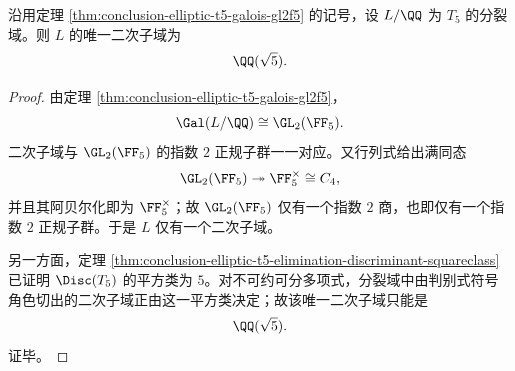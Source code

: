 \begin{theorem}\label{thm:conclusion-elliptic-t5-unique-quadratic-subfield}
沿用定理 \ref{thm:conclusion-elliptic-t5-galois-gl2f5} 的记号，设 \(L/\QQ\) 为 \(T_5\) 的分裂域。则 \(L\) 的唯一二次子域为
\[
\QQ(\sqrt5).
\]
\end{theorem}
\begin{proof}
由定理 \ref{thm:conclusion-elliptic-t5-galois-gl2f5}，
\[
\Gal(L/\QQ)\cong \GL_2(\FF_5).
\]
二次子域与 \(\GL_2(\FF_5)\) 的指数 \(2\) 正规子群一一对应。又行列式给出满同态
\[
\GL_2(\FF_5)\twoheadrightarrow \FF_5^\times\cong C_4,
\]
并且其阿贝尔化即为 \(\FF_5^\times\)；故 \(\GL_2(\FF_5)\) 仅有一个指数 \(2\) 商，也即仅有一个指数 \(2\) 正规子群。于是 \(L\) 仅有一个二次子域。

另一方面，定理 \ref{thm:conclusion-elliptic-t5-elimination-discriminant-squareclass} 已证明 \(\Disc(T_5)\) 的平方类为 \(5\)。对不可约可分多项式，分裂域中由判别式符号角色切出的二次子域正由这一平方类决定；故该唯一二次子域只能是
\[
\QQ(\sqrt5).
\]
证毕。
\end{proof}
